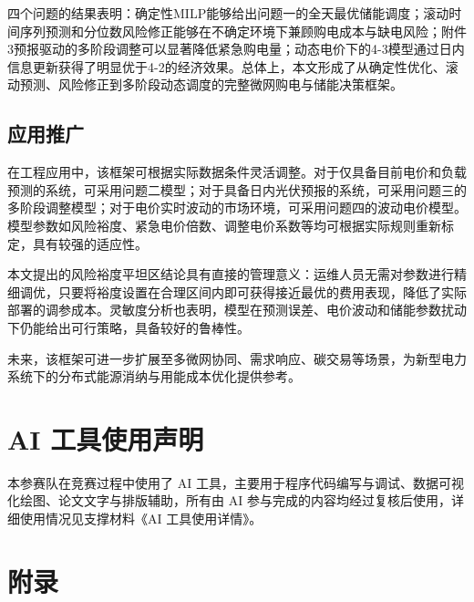 \documentclass[UTF8]{ctexart}
\begin{document}
    四个问题的结果表明：确定性MILP能够给出问题一的全天最优储能调度；滚动时间序列预测和分位数风险修正能够在不确定环境下兼顾购电成本与缺电风险；附件3预报驱动的多阶段调整可以显著降低紧急购电量；动态电价下的4-3模型通过日内信息更新获得了明显优于4-2的经济效果。总体上，本文形成了从确定性优化、滚动预测、风险修正到多阶段动态调度的完整微网购电与储能决策框架。\par
    
    \subsection{应用推广}
    
    在工程应用中，该框架可根据实际数据条件灵活调整。对于仅具备目前电价和负载预测的系统，可采用问题二模型；对于具备日内光伏预报的系统，可采用问题三的多阶段调整模型；对于电价实时波动的市场环境，可采用问题四的波动电价模型。模型参数如风险裕度、紧急电价倍数、调整电价系数等均可根据实际规则重新标定，具有较强的适应性。\par
    
    本文提出的风险裕度平坦区结论具有直接的管理意义：运维人员无需对参数进行精细调优，只要将裕度设置在合理区间内即可获得接近最优的费用表现，降低了实际部署的调参成本。灵敏度分析也表明，模型在预测误差、电价波动和储能参数扰动下仍能给出可行策略，具备较好的鲁棒性。\par
    
    未来，该框架可进一步扩展至多微网协同、需求响应、碳交易等场景，为新型电力系统下的分布式能源消纳与用能成本优化提供参考。\par
    
    \clearpage
    
    \section*{AI 工具使用声明}
    
    本参赛队在竞赛过程中使用了 AI 工具，主要用于程序代码编写与调试、数据可视化绘图、论文文字与排版辅助，所有由 AI 参与完成的内容均经过复核后使用，详细使用情况见支撑材料《AI 工具使用详情》。\par
    

    
    
    \clearpage
    \section*{附录}
    
\end{document}
